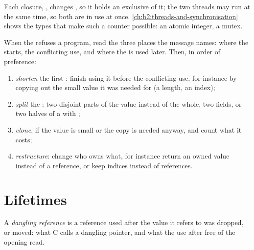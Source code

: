 \label{out:b2:rust-ownership:race}

Each closure, , changes , so it holds an exclusive  of it; the two threads may
run at the same time, so both  are in use at once. \cref{ch:b2:threads-and-synchronisation} shows the types
that make such a counter possible: an atomic integer, a mutex.

\begin{method}\label{met:b2:rust-ownership:fix-borrow}
When the  refuses a program, read the three places the message names: where the  starts, the
conflicting use, and where the  is used later. Then, in order of preference:
\begin{enumerate}
\item \emph{shorten} the first : finish using it before the conflicting use, for instance by copying out the
small value it was needed for (a length, an index);
\item \emph{split} the :  two disjoint parts of the value instead of the whole, two fields, or two halves
of a  with ;
\item \emph{clone}, if the value is small or the copy is needed anyway, and count what it costs;
\item \emph{restructure}: change who owns what, for instance return an owned value instead of a reference, or keep
indices instead of references.
\end{enumerate}
\end{method}

\section{Lifetimes}\label{sec:b2:rust-ownership:lifetimes}

\begin{definition}\label{def:b2:rust-ownership:dangling}
A \emph{dangling reference} is a reference used after the value it refers to was dropped,
or moved: what C calls a dangling pointer, and what the use after free of the opening read.
\end{definition}

